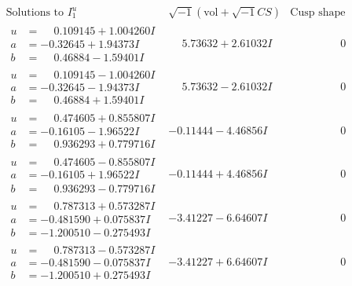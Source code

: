 \documentclass[1p]{elsarticle_modified}
\theoremstyle{definition}
\newcommand{\I}{\sqrt{-1}}
\begin{document}
$$\begin{array}{c|c|c}  
\text{Solutions to }I^u_{1}& \I (\text{vol} + \sqrt{-1}CS) & \text{Cusp shape}\\
 \hline 
\begin{aligned}
u &= \phantom{-}0.109145 + 1.004260 I \\
a &= -0.32645 + 1.94373 I \\
b &= \phantom{-}0.46884 - 1.59401 I\end{aligned}
 & \phantom{-}5.73632 + 2.61032 I & \phantom{-0.000000 } 0 \\ \hline\begin{aligned}
u &= \phantom{-}0.109145 - 1.004260 I \\
a &= -0.32645 - 1.94373 I \\
b &= \phantom{-}0.46884 + 1.59401 I\end{aligned}
 & \phantom{-}5.73632 - 2.61032 I & \phantom{-0.000000 } 0 \\ \hline\begin{aligned}
u &= \phantom{-}0.474605 + 0.855807 I \\
a &= -0.16105 - 1.96522 I \\
b &= \phantom{-}0.936293 + 0.779716 I\end{aligned}
 & -0.11444 - 4.46856 I & \phantom{-0.000000 } 0 \\ \hline\begin{aligned}
u &= \phantom{-}0.474605 - 0.855807 I \\
a &= -0.16105 + 1.96522 I \\
b &= \phantom{-}0.936293 - 0.779716 I\end{aligned}
 & -0.11444 + 4.46856 I & \phantom{-0.000000 } 0 \\ \hline\begin{aligned}
u &= \phantom{-}0.787313 + 0.573287 I \\
a &= -0.481590 + 0.075837 I \\
b &= -1.200510 - 0.275493 I\end{aligned}
 & -3.41227 - 6.64607 I & \phantom{-0.000000 } 0 \\ \hline\begin{aligned}
u &= \phantom{-}0.787313 - 0.573287 I \\
a &= -0.481590 - 0.075837 I \\
b &= -1.200510 + 0.275493 I\end{aligned}
 & -3.41227 + 6.64607 I & \phantom{-0.000000 } 0 \\ \hline\begin{aligned}

\end{aligned}
\end{array}$$
\end{document}
